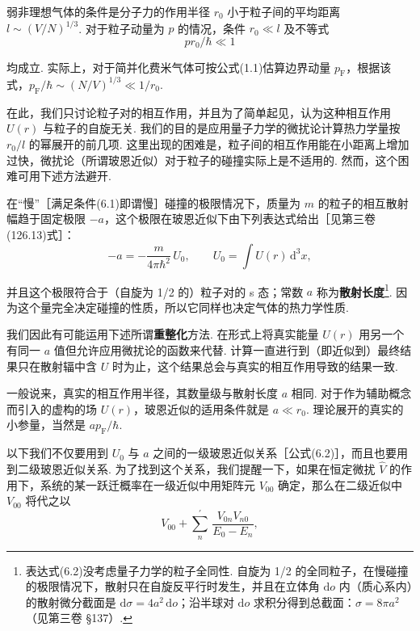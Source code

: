 弱非理想气体的条件是分子力的作用半径 $r_{0}$ 小于粒子间的平均距离 $l\sim(V/N)^{1/3}$. 对于粒子动量为 $p$ 的情况，条件 $r_{0}\ll l$ 及不等式
\begin{equation}
pr_{0}/\hbar\ll1
\end{equation}

均成立. 实际上，对于简并化费米气体可按公式(1.1)估算边界动量 $p_{\mathrm F}$，根据该式，$p_{\mathrm F}/\hbar\sim(N/V)^{1/3}\ll1/r_{0}$.

在此，我们只讨论粒子对的相互作用，并且为了简单起见，认为这种相互作用 $U(r)$ 与粒子的自旋无关. 我们的目的是应用量子力学的微扰论计算热力学量按 $r_{0}/l$ 的幂展开的前几项. 这里出现的困难是，粒子间的相互作用能在小距离上增加过快，微扰论（所谓玻恩近似）对于粒子的碰撞实际上是不适用的. 然而，这个困难可用下述方法避开.

在“慢”［满足条件(6.1)即谓慢］碰撞的极限情况下，质量为 $m$ 的粒子的相互散射幅趋于固定极限 $-a$，这个极限在玻恩近似下由下列表达式给出［见第三卷(126.13)式］：
\begin{equation}
-a=-\frac{m}{4\pi\hbar^{2}}\,U_{0},\qquad U_{0}=\int U(r)\,\mathrm{d}^{3}x,
\end{equation}

并且这个极限符合于（自旋为 1/2 的）粒子对的 s 态；常数 $a$ 称为\textbf{散射长度}\footnote{表达式(6.2)没考虑量子力学的粒子全同性. 自旋为 1/2 的全同粒子，在慢碰撞的极限情况下，散射只在自旋反平行时发生，并且在立体角 $\mathrm{d}o$ 内（质心系内）的散射微分截面是 $\mathrm{d}\sigma=4a^{2}\,\mathrm{d}o$；沿半球对 $\mathrm{d}o$ 求积分得到总截面：$\sigma=8\pi a^{2}$（见第三卷 §137）.}. 因为这个量完全决定碰撞的性质，所以它同样也决定气体的热力学性质.

我们因此有可能运用下述所谓\textbf{重整化}方法. 在形式上将真实能量 $U(r)$ 用另一个有同一 $a$ 值但允许应用微扰论的函数来代替. 计算一直进行到（即近似到）最终结果只在散射辐中含 $U$ 时为止，这个结果总会与真实的相互作用导致的结果一致.

一般说来，真实的相互作用半径，其数量级与散射长度 $a$ 相同. 对于作为辅助概念而引入的虚构的场 $U(r)$，玻恩近似的适用条件就是 $a\ll r_{0}$. 理论展开的真实的小参量，当然是 $ap_{\mathrm F}/\hbar$.

以下我们不仅要用到 $U_{0}$ 与 $a$ 之间的一级玻恩近似关系［公式(6.2)］，而且也要用到二级玻恩近似关系. 为了找到这个关系，我们提醒一下，如果在恒定微扰 $\hat V$ 的作用下，系统的某一跃迁概率在一级近似中用矩阵元 $V_{00}$ 确定，那么在二级近似中 $V_{00}$ 将代之以
\begin{equation*}
V_{00}+\sum_{n}^{\prime}\,\frac{V_{0n}V_{n0}}{E_{0}-E_{n}},
\end{equation*}

